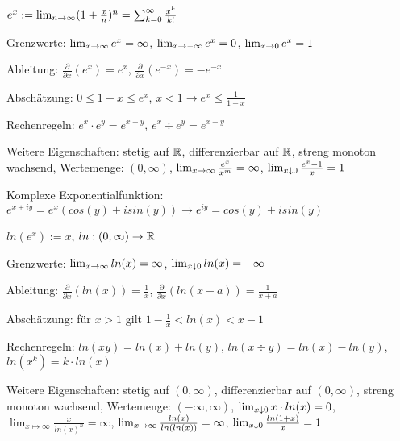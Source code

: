 \begin{definition}[Exponentialfunktion]
	$e^x := \lim_{n \rightarrow \infty} (1 + \frac{x}{n})^n = \sum_{k=0}^{\infty} \frac{x^k}{k!}$
	\begin{description} [noitemsep]
		\item Grenzwerte: $\lim_{x \rightarrow \infty} e^x = \infty$, $\lim_{x \rightarrow -\infty} e^x = 0$, $\lim_{x \rightarrow 0} e^x = 1$
		\item Ableitung: $\frac{\partial}{\partial x}(e^x) = e^x$, $\frac{\partial}{\partial x}(e^{-x}) = -e^{-x}$		
		\item Abschätzung: $ 0 \leq 1 + x \leq e^x$,  $x < 1 \rightarrow e^x \leq \frac{1}{1 - x}$ 
		\item Rechenregeln: $e^x \cdot e^y = e^{x+y}$, $e^x \div e^y = e^{x-y}$
		\item Weitere Eigenschaften: stetig auf $\mathbb{R}$, differenzierbar auf $\mathbb{R}$, streng monoton wachsend, Wertemenge: $(0, \infty)$, $\lim_{x \rightarrow \infty} \frac{e^x}{x^m} = \infty$, $\lim_{x \downarrow 0} \frac{e^x - 1}{x} = 1$
		\item Komplexe Exponentialfunktion: $e^{x+iy} = e^x(cos(y) + i sin(y)) \rightarrow e^{iy} = cos(y) + i sin(y)$
	\end{description}
\end{definition}

\begin{definition}[Logarithmusfunktion]
	$ln(e^x) := x$, $ln : (0, \infty) \rightarrow \mathbb{R}$
	
	\begin{description} [noitemsep]
		\item Grenzwerte: $\lim_{x \rightarrow \infty} ln (x) = \infty$, $\lim_{x \downarrow 0} ln (x )= - \infty$
		\item Ableitung: $\frac{\partial}{\partial x} (ln(x)) = \frac{1}{x}$, $\frac{\partial}{\partial x} (ln(x + a)) = \frac{1}{x + a}$
		\item Abschätzung: für $x > 1$ gilt $1 - \frac{1}{x} < ln(x) < x - 1$
		\item Rechenregeln: $ln(xy) = ln(x) + ln(y)$, $ln(x \div y) = ln(x) - ln(y)$, $ln(x^k) = k \cdot ln(x)$
		\item Weitere Eigenschaften: stetig auf $(0,\infty)$, differenzierbar auf $(0,\infty)$, streng monoton wachsend, Wertemenge: $(- \infty, \infty)$, $\lim_{x \downarrow 0} x \cdot ln(x) = 0$, $\lim_{x \mapsto \infty} \frac{x}{ln(x)^n} = \infty$,  $\lim_{x \rightarrow \infty} \frac{ln(x)}{ln(ln(x))} = \infty$,  $\lim_{x \downarrow 0} \frac{ln(1+x)}{x} = 1$
	\end{description}
\end{definition}

